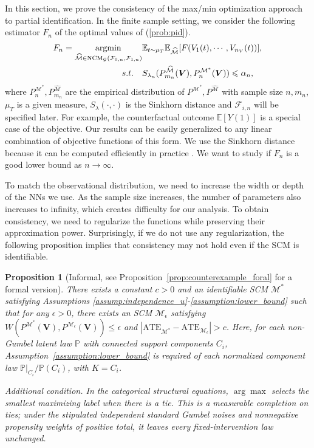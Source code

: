 \documentclass[12pt]{article}
\theoremstyle{plain}
\newtheorem{proposition}[theorem]{Proposition}
\theoremstyle{definition}
\theoremstyle{remark}
\begin{document}
In this section, we prove the consistency of the max/min optimization approach to partial identification. In the finite sample setting, we consider the following estimator $F_n$ of the optimal values of (\ref{prob:pid}).
\begin{align}
F_n = \mathop{\mathrm{argmin}}_{\widehat{\mathcal{M}} \in \text{NCM}_{\mathcal{G}}(\mathcal{F}_{0,n} ,\mathcal{F}_{1,n} )} & \mathbb{E}_{t\sim \mu _{T}}\mathbb{E}_{\widehat{\mathcal{M}}}[ F( V_{1}( t) ,\cdots ,V_{n_{V}}( t))] ,\label{eq:opt_empiri}\\
s.t.~~~ & S_{\lambda_n}(P_{m_n}^{\widehat{\mathcal{M}}}(\boldsymbol{V}) ,P^{\mathcal{M}^*}_{n}(\boldsymbol{V}) )\leqslant \alpha _{n} , \notag
\end{align}
where $ P^{\mathcal{M}^*}_{n}, P_{m_n}^{\hat{\mathcal{M}}}  $ are the empirical distribution of $ P^{\mathcal{M}^*},P^{\hat{\mathcal{M}}}$ with sample size $n,m_n$, $\mu_T$ is a given measure, $S_\lambda(\cdot,\cdot)$ is the Sinkhorn distance and $\mathcal{F}_{i,n}$ will be specified later. For example, the counterfactual outcome $\mathbb{E}[Y(1)]$ is a special case of the objective. Our results can be easily generalized to any linear combination of objective functions of this form. We use the Sinkhorn distance because it can be computed efficiently in practice \cite{feydy2020geometric}. We want to study if $F_n$ is a good lower bound as $n \rightarrow \infty$. \par %
To match the observational distribution, we need to increase the width or depth of the NNs we use. As the sample size increases, the number of parameters also increases to infinity, which creates difficulty for our analysis. To obtain consistency, we need to regularize the functions while preserving their approximation power. Surprisingly, if we do not use any regularization, the following proposition implies that consistency may not hold even if the SCM is identifiable. 
\begin{proposition}[Informal, see Proposition~\ref{prop:counterexample_foral} for a formal version]\label{prop:counterexample} 
There exists a constant $c>0$ and an identifiable SCM $\mathcal{M}^*$ satisfying Assumptions \ref{assump:independence_u}-\ref{assumption:lower_bound} such that for any $\epsilon >0$, there exists an SCM $\mathcal{M}_\epsilon$ satisfying $W(P^{\mathcal{M}^*}(\boldsymbol{V}),P^{\mathcal{M}_\epsilon}(\boldsymbol{V})) \leq \epsilon $ and $|\text{ATE}_{\mathcal{M}^*} - \text{ATE}_{\mathcal{M}_\epsilon}| > c $.
Here, for each non-Gumbel latent law $\mathbb P$ with connected support components $C_i$, Assumption~\ref{assumption:lower_bound} is required of each normalized component law $\mathbb P|_{C_i}/\mathbb P(C_i)$, with $K=C_i$.

\emph{Additional condition.} In the categorical structural equations, $\arg\max$ selects the smallest maximizing label when there is a tie. This is a measurable completion on ties; under the stipulated independent standard Gumbel noises and nonnegative propensity weights of positive total, it leaves every fixed-intervention law unchanged.
\end{proposition}
\end{document}

